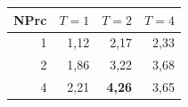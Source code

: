 \begin{tabular}{@{}rrrr@{}}
\toprule
NPrc & $T=1$ & $T=2$ & $T=4$ \\
\midrule
1 & 1{,}12 & 2{,}17 & 2{,}33 \\
2 & 1{,}86 & 3{,}22 & 3{,}68 \\
4 & 2{,}21 & \textbf{4{,}26} & 3{,}65 \\
\bottomrule
\end{tabular}
